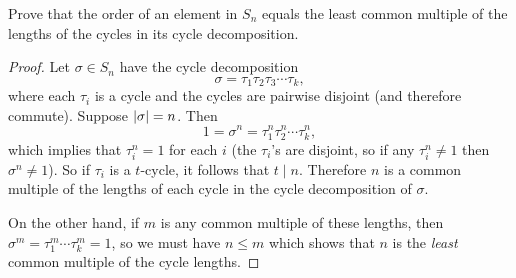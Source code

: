  Prove that the order of an element in $S_n$ equals the
least common multiple of the lengths of the cycles in its cycle
decomposition.
\begin{proof}
  Let $\sigma\in S_n$ have the cycle decomposition
  \begin{equation*}
    \sigma = \tau_1\tau_2\tau_3\cdots\tau_k,
  \end{equation*}
  where each $\tau_i$ is a cycle and the cycles are pairwise disjoint
  (and therefore commute). Suppose $\lvert{\sigma}\rvert = n$. Then
  \begin{equation*}
    1 = \sigma^n = \tau_1^n\tau_2^n\cdots\tau_k^n,
  \end{equation*}
  which implies that $\tau_i^n = 1$ for each $i$ (the $\tau_i$'s are
  disjoint, so if any $\tau_i^n\neq1$ then $\sigma^n\neq1$). So if
  $\tau_i$ is a $t$-cycle, it follows that $t\mid n$. Therefore $n$ is
  a common multiple of the lengths of each cycle in the cycle
  decomposition of $\sigma$.

  On the other hand, if $m$ is any common multiple of these lengths,
  then $\sigma^m = \tau_1^m\cdots\tau_k^m = 1$, so we must have
  $n \leq m$ which shows that $n$ is the {\em least} common multiple
  of the cycle lengths.
\end{proof}
